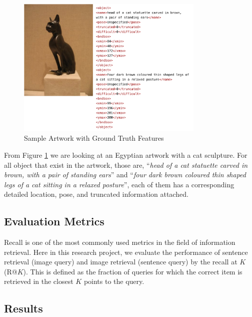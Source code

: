 \begin{figure}[h!]
\centering
\includegraphics[width=0.8\textwidth]{sampledata.pdf}
\caption{Sample Artwork with Ground Truth Features}
\label{fig:sampledata}
\end{figure}

From Figure \ref{fig:sampledata} we are looking at an Egyptian artwork with a cat sculpture. For all object that exist in the artwork, those are, ``\textit{head of a cat statuette carved in brown, with a pair of standing ears}'' and ``\textit{four dark brown coloured thin shaped legs of a cat sitting in a relaxed posture}'', each of them has a corresponding detailed location, pose, and truncated information attached. 

\subsection{Evaluation Metrics}

Recall is one of the most commonly used metrics in the field of information retrieval. Here in this research project, we evaluate the performance of sentence retrieval (image query) and image retrieval (sentence query) by the recall at $K$ (R@$K$). This is defined as the fraction of queries for which the correct item is retrieved in the closest $K$ points to the query. 

\subsection{Results}


